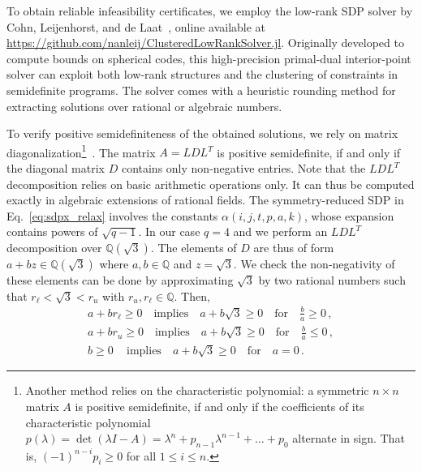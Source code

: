 \documentclass[12pt,a4paper]{amsart}
\newcommand{\Q}{\mathds{Q}}
\newcommand{\nn}{\nonumber}
\begin{document}
To obtain reliable infeasibility certificates, we employ the low-rank SDP solver by Cohn, Leijenhorst, and de Laat~\cite{cohn2024optimalitysphericalcodesexact, Leijenhorst_2024}, online available at \url{https://github.com/nanleij/ClusteredLowRankSolver.jl}.
Originally developed to compute bounds on spherical codes, this high-precision primal-dual interior-point solver can exploit both low-rank structures and the clustering of constraints in semidefinite programs.
The solver comes with a heuristic rounding method for extracting solutions over rational or algebraic numbers.

To verify positive semidefiniteness of the obtained solutions, 
we rely on matrix diagonalization\footnote{
Another method relies on the characteristic polynomial: 
a symmetric $n\times n$ 
matrix $A$ is positive semidefinite, 
if and only if 
the coefficients of its characteristic polynomial
$p(\lambda) = \det(\lambda I -A) = \lambda^n + p_{n-1}\lambda^{n-1} + 
\dots + p_0$ alternate in sign. That is,
$(-1)^{n-i}p_i\geq 0$ for all $1\leq i\leq n$.}~\cite{PEYRL2008269}. 
The matrix $A = LDL^T$ is positive semidefinite, 
if and only if the diagonal matrix $D$ contains only non-negative entries.
Note that the $LDL^T$ decomposition relies 
on basic arithmetic operations only.
It can thus be computed exactly 
in algebraic extensions of rational fields.
%
The symmetry-reduced SDP in Eq.~\eqref{eq:sdpx_relax} involves the constants $\alpha(i,j,t,p,a,k)$, 
whose expansion contains powers of $\sqrt{q-1}$. 
In our case $q=4$ and we perform an $LDL^T$ decomposition 
over $\Q(\sqrt{3})$.
% 
The elements of $D$ are thus of form $a+bz \in \Q(\sqrt{3})$ where $a,b\in \Q$ and $z=\sqrt{3}$.
% 
We check the non-negativity of these elements can be done by approximating $\sqrt{3}$ by two rational numbers such that $r_\ell < \sqrt{3} < r_u$ with $r_u,r_\ell \in \mathbb{Q}$. 
Then,
\begin{align}
    a+br_\ell \geq 0 \quad \text{implies} \quad a+b\sqrt{3} \geq 0 \quad \text{for}\quad 
    \tfrac{b}{a}
    \geq 0\,, \nn\\
    a+br_u \geq 0 \quad \text{implies} \quad a+b\sqrt{3} \geq 0 \quad \text{for}\quad 
    \tfrac{b}{a}\leq 0\,, \nn\\
    b \geq 0 \quad\, \text{implies} \quad a+b\sqrt{3} \geq 0 \quad \text{for}\quad 
    a=0 \,.
\end{align}
\end{document}
